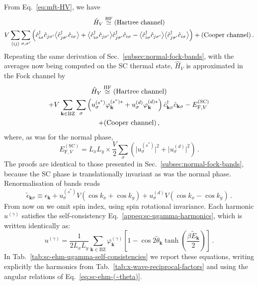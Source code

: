 From Eq.~\eqref{eq:mft-HV}, we have
\begin{multline*}
	\hat H_V \HFsimeq (\text{Hartree channel}) \\
	V \sum_{\ev{ij}} \sum_{\sigma,\sigma'} \Big(
	\hat c_{i\sigma}^\dagger \hat c_{j\sigma'} \big\langle \hat c_{j\sigma'}^\dagger \hat c_{i\sigma} \big\rangle + \big\langle \hat c_{i\sigma}^\dagger \hat c_{j\sigma'} \big\rangle \hat c_{j\sigma'}^\dagger \hat c_{i\sigma} - \big\langle \hat c_{i\sigma}^\dagger \hat c_{j\sigma'} \big\rangle  \big\langle \hat c_{j\sigma'}^\dagger \hat c_{i\sigma} \big\rangle \Big)
	+ (\text{Cooper channel}) \, .
\end{multline*}
Repeating the same derivation of Sec.~\ref{subsec:normal-fock-bands}, with the averages now being computed on the SC thermal state, $\hat H_V$ is approximated  in the Fock channel by
\begin{multline}
	\hat H_V \stackrel{\mathrm{HF}}{\simeq} (\text{Hartree channel}) \\
	+ 
	V
	\sum_{\mathbf{k}\in\mathrm{BZ}} \sum_\sigma
	\left(
	u^{(s^*)}_\sigma
	\varphi_\mathbf{k}^{(s^*)*} + u^{(d)}_\sigma
	\varphi_\mathbf{k}^{(d)*}
	\right)
	\hat c_{\mathbf{k}\sigma}^\dagger
	\hat c_{\mathbf{k}\sigma}
	- E_{\mathrm{F},V}^{(\mathrm{SC})} \\ + (\text{Cooper channel}) \label{eq:sc-HV-fock-approx} \, ,
\end{multline}
where, as was for the normal phase,
\begin{equation}\label{eq:sc-HV-fock-Ec}
	E_{\mathrm{F},V}^{(\mathrm{SC})} = L_x L_y \times \frac{V}{2} \sum_\sigma \left(
	\big|
	u_\sigma^{(s^*)}
	\big|^2 + \big|
	u_\sigma^{(d)}
	\big|^2
	\right) \, .
\end{equation}
The proofs are identical to those presented in Sec.~\ref{subsec:normal-fock-bands}, because the SC phase is translationally invariant as was the normal phase. Renormalisation of bands reads
\begin{equation}\label{appeq:sc-bands-renormalisation}
	\tilde{\epsilon}_{\mathbf{k}\sigma} \equiv \epsilon_\mathbf{k} + u^{(s^*)}_\sigma V (\cos k_x + \cos k_y) + u^{(d)}_\sigma V (\cos k_x - \cos k_y) \, .
\end{equation}
From now on we omit spin index, using spin rotational invariance. Each harmonic $u^{(\gamma)}$ satisfies the self-consistency Eq.~\eqref{appeq:sc-ugamma-harmonics}, which is written identically as:
\begin{equation}\label{eq:sc-hm-ugamma-self-consistency}
	u^{(\gamma)} = \frac{1}{2L_x L_y} 	\sum_{\mathbf{k}\in\mathrm{BZ}} \varphi_\mathbf{k}^{(\gamma)} \left[
	1 - \cos 2 \tilde{\theta}_\mathbf{k} \tanh(\frac{\beta \tilde{E}_\mathbf{k}}{2})
	\right] \, .
\end{equation}
In Tab.~\ref{tab:sc-ehm-ugamma-self-consistencies}
we report these equations, writing explicitly the harmonics from Tab.~\ref{tab:x-wave-reciprocal-factors} and using the angular relations of Eq.~\eqref{eq:sc-ehm-(~theta)}.

